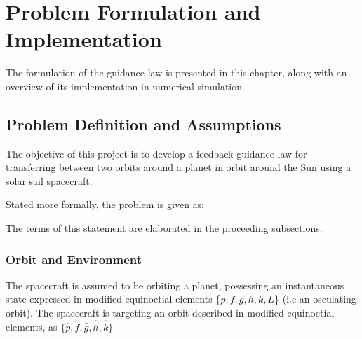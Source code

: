 \chapter{Problem Formulation and Implementation}

The formulation of the guidance law is presented in this chapter, along with an overview of its implementation in numerical simulation. 

\section{Problem Definition and Assumptions}
The objective of this project is to develop a feedback guidance law for transferring between two orbits around a planet in orbit around the Sun using a solar sail spacecraft.

Stated more formally, the problem is given as:


The terms of this statement are elaborated in the proceeding subsections.

\subsection{Orbit and Environment}
\label{sec:orbit_environment}
The spacecraft is assumed to be orbiting a planet, possessing an instantaneous state expressed in modified equinoctial elements \{$p, f, g, h, k, L$\} (i.e an osculating orbit). The spacecraft is targeting an orbit described in modified equinoctial elements, as $\{\hat{p}, \hat{f}, \hat{g}, \hat{h}, \hat{k}\}$

